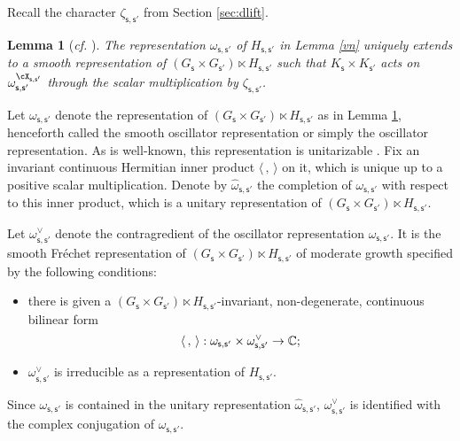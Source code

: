 \documentclass[12pt,a4paper]{amsart}
\newcommand{\la}{\langle}
\newcommand{\ra}{\rangle}
\numberwithin{equation}{section}
\newtheorem{lem}[thm]{Lemma}
\theoremstyle{remark}
\def\cf{\emph{cf.} }
\begin{document}
Recall the character $\zeta_{\mathsf s, \mathsf s'}$ from Section \ref{sec:dlift}.

\begin{lem}[{\cf \cite[Proposition 7.5]{Ad07}}]\label{deforos}
The representation $\omega_{\mathsf s, \mathsf s'}$ of $H_{\mathsf s, \mathsf s'}$ in Lemma \ref{vn} uniquely extends to a  smooth representation of $(G_{\mathsf s}\times G_{\mathsf s'})\ltimes H_{\mathsf s, \mathsf s'}$ such  that $K_{\mathsf s}\times  K_{\mathsf s'}$ acts on  $ \omega_{\mathsf s, \mathsf s'}^{\cX_{\mathsf s, \mathsf s'}}$ through the scalar multiplication by $\zeta_{\mathsf s, \mathsf s'}$.
\end{lem}

Let $\omega_{\mathsf s, \mathsf s'}$ denote the representation of $(G_{\mathsf s}\times G_{\mathsf s'})\ltimes H_{\mathsf s, \mathsf s'}$ as in Lemma \ref{deforos}, henceforth called the smooth oscillator representation or simply the oscillator representation. As is well-known, this representation is unitarizable \cite{Weil}. Fix an invariant continuous Hermitian inner product $\la\,,\,\ra$ on it, which is unique up to a positive scalar multiplication.
Denote by $\hat \omega_{\mathsf s, \mathsf s'}$ the completion of $\omega_{\mathsf s, \mathsf s'}$ with respect to this inner product, which is a unitary representation of  $(G_{\mathsf s}\times G_{\mathsf s'})\ltimes H_{\mathsf s, \mathsf s'}$.

 Let $\omega_{\mathsf s, \mathsf s'}^\vee$ denote the  contragredient of the  oscillator  representation $\omega_{\mathsf s, \mathsf s'}$. It is  the smooth Fr\'echet representation of $(G_{\mathsf s}\times G_{\mathsf s'})\ltimes H_{\mathsf s, \mathsf s'}$ of moderate growth specified by the following conditions:
 \begin{itemize}
 \item there is given a  $(G_{\mathsf s}\times G_{\mathsf s'})\ltimes H_{\mathsf s, \mathsf s'}$-invariant, non-degenerate, continuous bilinear form
 \[
   \la\,,\,\ra:  \omega_{\mathsf s, \mathsf s'}\times \omega_{\mathsf s, \mathsf s'}^\vee\rightarrow \C;
 \]
 \item  $\omega_{\mathsf s, \mathsf s'}^\vee$  is irreducible as a representation of $H_{\mathsf s, \mathsf s'}$.
 \end{itemize}
Since $\omega_{\mathsf s, \mathsf s'}$ is contained in the unitary representation $\hat \omega_{\mathsf s, \mathsf s'}$, $\omega_{\mathsf s, \mathsf s'}^\vee$ is identified with the complex conjugation of $\omega_{\mathsf s, \mathsf s'}$.
\end{document}
